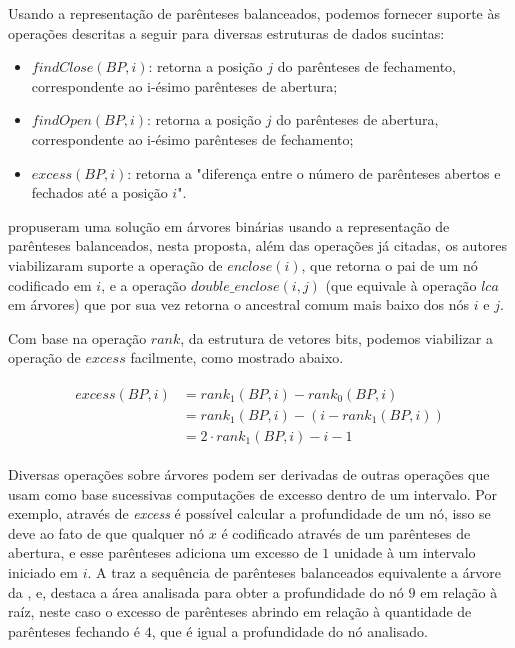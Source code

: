Usando a representação de parênteses balanceados, podemos fornecer suporte às operações descritas a seguir para diversas estruturas de dados sucintas:
\begin{itemize}
    \item $findClose(BP,i)$: retorna a posição $j$ do parênteses de fechamento, correspondente ao i-ésimo parênteses de abertura;
    \item $findOpen(BP, i)$: retorna a posição $j$ do parênteses de abertura, correspondente ao i-ésimo parênteses de fechamento;
    \item $excess(BP, i)$: retorna a "diferença entre o número de parênteses abertos e fechados até a posição $i$".  \cite[tradução nossa]{paper-succint-representation-of-balanced-parentheses}
\end{itemize}

\citet{paper-succint-representation-of-balanced-parentheses} propuseram uma solução em árvores binárias usando a representação de parênteses balanceados, nesta proposta,  além das operações já citadas, os autores viabilizaram suporte a operação de $enclose(i)$, que retorna o pai de um nó codificado em $i$,  e a operação $double\_enclose(i,j)$ (que equivale à operação $lca$ em árvores) que por sua vez retorna o ancestral comum mais baixo dos nós $i$ e $j$. 

Com base na operação  $rank$, da estrutura de vetores bits, podemos viabilizar a operação de $excess$ facilmente, como mostrado abaixo.

\begin{eqnarray*}
    \begin{split}
        excess(BP,i) &= rank_1(BP,i) - rank_0(BP,i) \\
        &  = rank_1(BP,i) - (i - rank_1(BP,i)) \\
        &  = 2 \cdot rank_1(BP,i) - i -1 
    \end{split}
\end{eqnarray*}

Diversas operações sobre árvores podem ser derivadas de outras operações que usam como base sucessivas computações de excesso dentro de um intervalo. Por exemplo, através de \textit{excess} é possível calcular a profundidade de um nó, isso se deve ao fato de que qualquer nó $x$ é codificado através de um parênteses de abertura, e esse parênteses adiciona um excesso de $1$ unidade à um intervalo iniciado em $i$. A  traz a sequência de parênteses balanceados equivalente a árvore da , e, destaca a área analisada para obter a profundidade do nó $9$ em relação à raíz, neste caso o excesso de parênteses abrindo em relação à quantidade de parênteses fechando é $4$, que é igual a profundidade do nó analisado.

